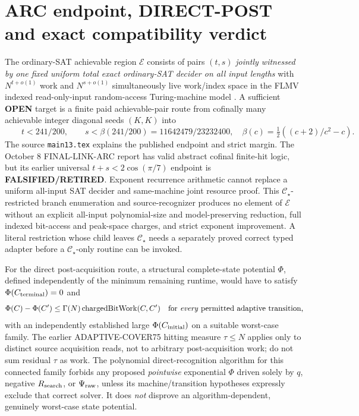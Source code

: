 \documentclass[11pt]{article}
\newcommand{\CS}{\mathcal C_\star}
\begin{document}
\section{ARC endpoint, DIRECT-POST and exact compatibility verdict}
The ordinary-SAT achievable region \(\mathcal E\) consists of pairs \((t,s)\) \emph{jointly witnessed by one fixed uniform total exact ordinary-SAT decider on all input lengths} with \(N^{t+o(1)}\) work and \(N^{s+o(1)}\) simultaneously live work/index space in the FLMV indexed read-only-input random-access Turing-machine model \cite{flmv}. A sufficient \textbf{OPEN} target is a finite paid achievable-pair route from cofinally many achievable integer diagonal seeds \((K,K)\) into
\[
\boxed{\qquad t<241/200,\qquad
s<\beta(241/200)=11642479/23232400,\quad
\beta(c)=\tfrac12((c+2)/c^2-c).\qquad}
\]
The source \texttt{main13.tex} explains the published endpoint and strict margin. The October 8 FINAL-LINK-ARC report has valid abstract cofinal finite-hit logic, but its earlier universal \(t+s<2\cos(\pi/7)\) endpoint is \textbf{FALSIFIED/RETIRED}. Exponent recurrence arithmetic cannot replace a uniform all-input SAT decider and same-machine joint resource proof. This \(\CS\)-restricted branch enumeration and source-recognizer produces no element of \(\mathcal E\) without an explicit all-input polynomial-size and model-preserving reduction, full indexed bit-access and peak-space charges, and strict exponent improvement. A literal restriction whose child leaves \(\CS\) needs a separately proved correct typed adapter before a \(\CS\)-only routine can be invoked.

For the direct post-acquisition route, a structural complete-state potential \(\Phi\), defined independently of the minimum remaining runtime, would have to satisfy \(\Phi(C_{\rm terminal})=0\) and
\[
 \Phi(C)-\Phi(C')\le \Gamma(N)\,\mathrm{chargedBitWork}(C,C')
\quad\text{for \emph{every} permitted adaptive transition,}
\]
with an independently established large \(\Phi(C_{\rm initial})\) on a suitable worst-case family. The earlier ADAPTIVE-COVER75 hitting measure \(\tau\le N\) applies only to distinct source acquisition reads, not to arbitrary post-acquisition work; do not sum residual \(\tau\) as work. The polynomial direct-recognition algorithm for this connected family forbids any proposed \emph{pointwise} exponential \(\Phi\) driven solely by \(q\), negative \(R_{\rm search}\), or \(\Psi_{\rm raw}\), unless its machine/transition hypotheses expressly exclude that correct solver. It does \emph{not} disprove an algorithm-dependent, genuinely worst-case state potential.
\end{document}
